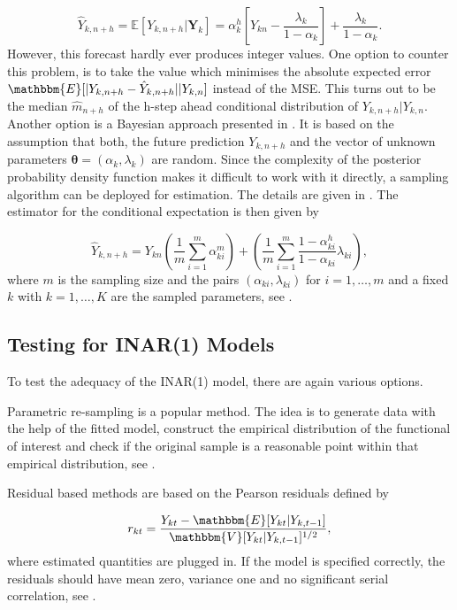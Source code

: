 \begin{equation}
\hat{Y}_{k,n+h} = \mathbb{E}[Y_{k,n+h} | \bm{Y}_k] = \alpha_k^h \left[Y_{kn}- \frac{\lambda_k}{1-\alpha_k} \right] + \frac{\lambda_k}{1-\alpha_k}.
\label{eq:Forecasting Classic}
\end{equation}
%
However, this forecast hardly ever produces integer values. One option to counter this problem, is to take the value which minimises the absolute expected error $\mathbbm{E}[\abs{Y_{k,n+h} - \hat{Y}_{k,n+h}}|Y_{k,n}]$ instead of the MSE. This turns out to be the median $\hat{m}_{n+h}$ of the h-step ahead conditional distribution of $Y_{k,n+h}|Y_{k,n}$. Another option is a Bayesian approach presented in \textcite{Silva:2005}. It is based on the assumption that both, the future prediction $Y_{k,n+h}$ and the vector of unknown parameters $\bm{\theta}=(\alpha_k,\lambda_k)$ are random. Since the complexity of the posterior probability density function makes it difficult to work with it directly, a sampling algorithm can be deployed for estimation. The details are given in \textcite{Silva:2005}. The estimator for the conditional expectation is then given by

\begin{equation}
\hat{Y}_{k,n+h}= Y_{kn}\left(\frac{1}{m} \sum_{i=1}^m\alpha_{ki}^m\right) + \left(\frac{1}{m} \sum_{i=1}^m \frac{1-\alpha_{ki}^h}{1-\alpha_{ki}}\lambda_{ki}\right),
\label{eq:Forecasting Bayesian}
\end{equation}
%
where $m$ is the sampling size and the pairs $(\alpha_{ki},\lambda_{ki})$ for $i=1,\ldots,m$ and a fixed $k$ with $k=1,\ldots,K$ are the sampled parameters, see \textcite{Silva:2005,Freeland:2004}. 

\subsection{Testing for INAR(1) Models}
\label{sec:Testing for INAR(1) Models}

To test the adequacy of the INAR(1) model, there are again various options. 

Parametric re-sampling is a popular method. The idea is to generate data with the help of the fitted model, construct the empirical distribution of the functional of interest and check if the original sample is a reasonable point within that empirical distribution, see \textcite{Silva:2005}. 

Residual based methods are based on the Pearson residuals defined by 

\begin{equation}
r_{kt} = \frac{Y_{kt}-\mathbbm{E}[Y_{kt}|Y_{k,t-1}]}{\mathbbm{V}[Y_{kt}|Y_{k,t-1}]^{1/2}},
\label{eq:Pearson residuals}
\end{equation}
%
where estimated quantities are plugged in. If the model is specified correctly, the residuals should have mean zero, variance one and no significant serial correlation, see \textcite{Silva:2005}. 

